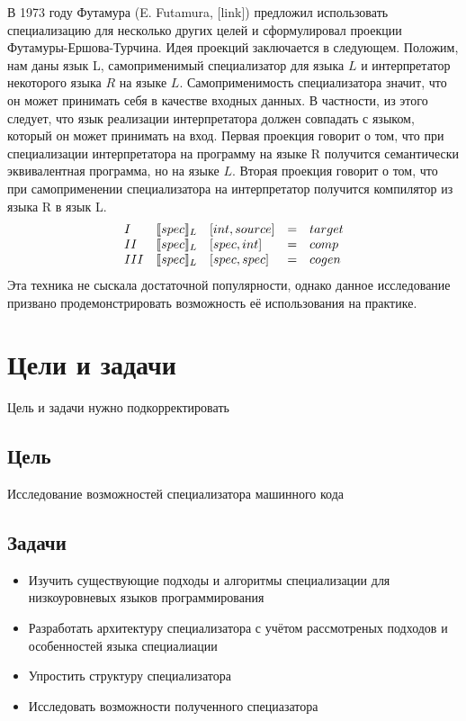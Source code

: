 \documentclass{spbau-diploma}
\begin{document}
В 1973 году Футамура (E. Futamura, [link]) предложил использовать специализацию для несколько других целей и сформулировал проекции Футамуры-Ершова-Турчина. Идея проекций заключается в следующем. Положим, нам даны язык L, самоприменимый специализатор для языка $L$ и интерпретатор некоторого языка $R$ на языке $L$. Самоприменимость специализатора значит, что он может принимать себя в качестве входных данных. В частности, из этого следует, что язык реализации интерпретатора должен совпадать с языком, который он может принимать на вход. Первая проекция говорит о том, что при специализации интерпретатора на программу на языке R получится семантически эквивалентная программа, но на языке $L$. Вторая проекция говорит о том, что при самоприменении специализатора на интерпретатор получится компилятор из языка R в язык L.
    $$
    \begin{array}{l l l c l}
      I & \llbracket spec \rrbracket_L &[int, source] &= &target\\
      II & \llbracket spec \rrbracket_L &[spec, int] &= &comp\\
      III & \llbracket spec \rrbracket_L &[spec, spec] &= &cogen
    \end{array}$$
Эта техника не сыскала достаточной популярности, однако данное исследование призвано продемонстрировать возможность её использования на практике.

\section{Цели и задачи}

{\LARGE Цель и задачи нужно подкорректировать}

\subsection{Цель}
Исследование возможностей специализатора машинного кода

\subsection{Задачи}
\begin{itemize}
\item Изучить существующие подходы и алгоритмы специализации для низкоуровневых языков программирования
\item Разработать архитектуру специализатора с учётом рассмотреных подходов и особенностей языка специалиации
\item Упростить структуру специализатора
\item Исследовать возможности полученного специазатора
\end{itemize}
\end{document}
